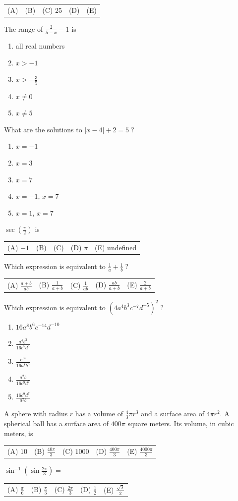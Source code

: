 \documentclass[letterstyle,12pt]{extarticle}
\newcounter{qcounter}
\newcommand{\choices}[5]{
\vspace{0.8em} 
\begin{enumerate}[label=(\Alph*)]
\setlength\itemsep{1em} 
\item
#1 
\item 
#2
\item
#3
\item
#4
\item
#5
\end{enumerate}
}
\newcommand{\choicesline}[5]{    
\vspace{2em} \break 
\begin{tabularx}{0.95 \textwidth} { 
>{\arraybackslash}X 
>{\arraybackslash}X 
>{\arraybackslash}X 
>{\arraybackslash}X 
>{\arraybackslash}X }
(A) \; #1
& 
(B) \; #2
& 
(C) \; #3
& 
(D) \; #4
&
(E) \; #5 
\end{tabularx}
\vspace{2em} \break
}
\newcommand{\ans}[1]{{\color{black} #1}}
\newenvironment{question}
    {\begin{minipage}{0.9 \textwidth}
        \item
    }
    { 
    \end{minipage} \vspace{4ex}
    }
\begin{document}
\begin{list}{\textbf{.}~}{}
\begin{question}
\choicesline
{8}
{20}
{\ans{25}}
{30}
{125}
\end{question}

\begin{question}
The range of \(\frac{2}{5 - x} - 1\) is 
\choices
{\ans{all real numbers}}
{\(x > -1\)}
{\(x > -\frac{3}{5}\)}
{\(x \ne 0\)}
{\(x \ne 5\)}
\end{question}

\begin{question}
What are the solutions to \(|x - 4| + 2 = 5 \; ?\)
\choices
{\(x = -1\)}
{\(x = 3\)}
{\(x = 7\)}
{\(x = -1, \, x = 7\)}
{\ans{\(x = 1, \, x = 7\)}}
\end{question}

\begin{question}
\(\sec \left(\frac{\pi}{2} \right)\) is 
\choicesline
{\(-1\)}
{0}
{1}
{\(\pi\)}
{\ans{undefined}}
\end{question}

\begin{question}
Which expression is equivalent to \(\frac{1}{a} + \frac{1}{b} \; ?\) \\
\choicesline
{\ans{\(\frac{a + b}{ab}\)}}
{\(\frac{1}{a + b}\)}
{\(\frac{1}{ab}\)}
{\(\frac{ab}{a + b}\)}
{\(\frac{2}{a + b}\)}
\end{question}

\begin{question}
Which expression is equivalent to \(\left(4a^4 b^3 c^{-7} d^{-5}\right)^2 \; ?\)
\choices
{\(16 a^8 b^6 c^{-14} d^{-10}\)}
{\(\frac{a^4 b^3}{16 c^7 d^5}\)}
{\ans{\(\frac{c^{14}}{16 a^8 b^6}\)}}
{\(\frac{a^2 b}{16 c^9 d^7}\)}
{\(\frac{16 c^9 d^7}{a^2 b}\)}
\end{question}

\begin{question}
A sphere with radius \(r\) has a volume of \(\frac{4}{3} \pi r^3\) and a surface area of \(4 \pi r^2.\)
A spherical ball has a surface area of \(400 \pi\) square meters. Its volume, in cubic meters, is 
\choicesline
{\(10\)}
{\(\frac{40 \pi}{3}\)}
{\(1000\)}
{\(\frac{400 \pi}{3}\)}
{\ans{\(\frac{4000 \pi}{3}\)}}
\end{question}

\begin{question}
\(\sin^{-1} \left(\sin \frac{2 \pi}{3}\right) =\) \\
\choicesline
{\(\frac{\pi}{6}\)}
{\ans{\(\frac{\pi}{3}\)}}
{\(\frac{2 \pi}{3}\)}
{\(\frac{1}{2}\)}
{\(\frac{\sqrt 3}{2}\)}
\end{question}


\end{list}
\end{document}
